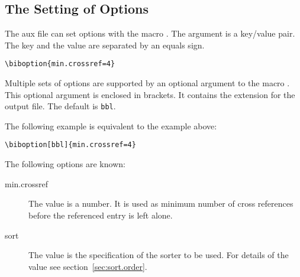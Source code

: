 \subsection{The Setting of Options}

The aux file can set options with the macro . The
argument is a key/value pair. The key and the value are separated by
an equals sign.

\begin{lstlisting}[language={[LaTeX]TeX}]
  \biboption{min.crossref=4}
\end{lstlisting}

Multiple sets of options are supported by an optional argument to
the macro . This optional argument is enclosed in
brackets. It contains the extension for the output file. The default
is \texttt{bbl}.

The following example is equivalent to the example above:

\begin{lstlisting}[language={[LaTeX]TeX}]
  \biboption[bbl]{min.crossref=4}
\end{lstlisting}

The following options are known:

\begin{description}
\item[min.crossref] The value is a number. It is used as minimum
  number of cross references before the referenced entry is left
  alone.
\item[sort] The value is the specification of the sorter to be
  used. For details of the value see section~\ref{sec:sort.order}.
\end{description}

\endinput
%
